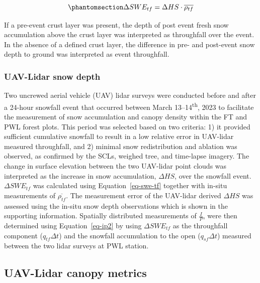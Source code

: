 \documentclass[
  letterpaper,
  DIV=11,
  numbers=noendperiod]{scrartcl}
\begin{document}
\begin{equation}\phantomsection\label{eq-swe-tf}{
\Delta SWE_{tf} = \Delta HS \cdot \overline{\rho_{tf}}
}\end{equation}

If a pre-event crust layer was present, the depth of post event fresh
snow accumulation above the crust layer was interpreted as throughfall
over the event. In the absence of a defined crust layer, the difference
in pre- and post-event snow depth to ground was interpreted as event
throughfall.

\subsubsection{UAV-Lidar snow depth}\label{uav-lidar-snow-depth}

Two uncrewed aerial vehicle (UAV) lidar surveys were conducted before
and after a 24-hour snowfall event that occurred between March
13--14\textsuperscript{th}, 2023 to facilitate the measurement of snow
accumulation and canopy density within the FT and PWL forest plots. This
period was selected based on two criteria: 1) it provided sufficient
cumulative snowfall to result in a low relative error in UAV-lidar
measured throughfall, and 2) minimal snow redistribution and ablation
was observed, as confirmed by the SCLs, weighed tree, and time-lapse
imagery. The change in surface elevation between the two UAV-lidar point
clouds was interpreted as the increase in snow accumulation,
\(\Delta HS\), over the snowfall event. \(\Delta SWE_{tf}\) was
calculated using Equation~\ref{eq-swe-tf} together with in-situ
measurements of \(\overline{\rho_{tf}}\). The measurement error of the
UAV-lidar derived \(\Delta HS\) was assessed using the in-situ snow
depth observations which is shown in the supporting information.
Spatially distributed measurements of \(\frac{I}{P}\), were then
determined using Equation~\ref{eq-ip2} by using \(\Delta SWE_{tf}\) as
the throughfall component (\(q_{tf} \Delta t\)) and the snowfall
accumulation to the open (\(q_{sf} \Delta t\)) measured between the two
lidar surveys at PWL station.

\subsection{UAV-Lidar canopy metrics}\label{uav-lidar-canopy-metrics}
\end{document}
